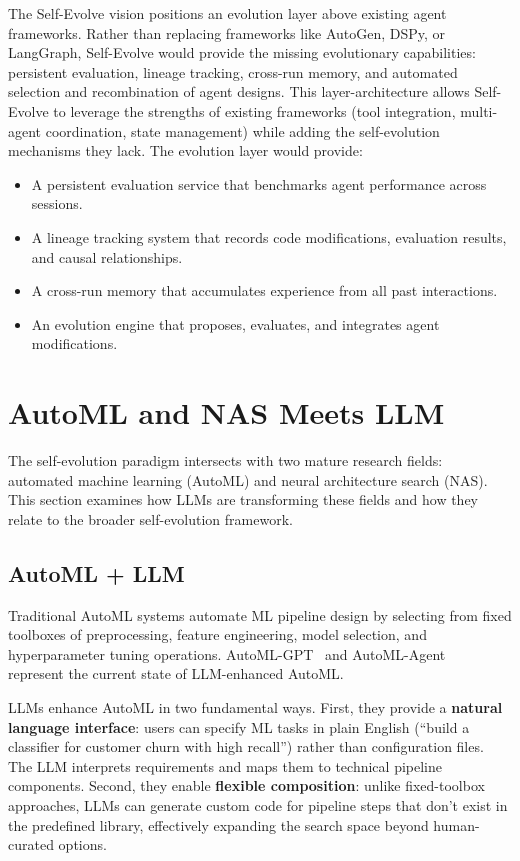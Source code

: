 \documentclass[11pt,a4paper]{article}
\begin{document}
The Self-Evolve vision positions an evolution layer above existing agent frameworks. Rather than replacing frameworks like AutoGen, DSPy, or LangGraph, Self-Evolve would provide the missing evolutionary capabilities: persistent evaluation, lineage tracking, cross-run memory, and automated selection and recombination of agent designs. This layer-architecture allows Self-Evolve to leverage the strengths of existing frameworks (tool integration, multi-agent coordination, state management) while adding the self-evolution mechanisms they lack. The evolution layer would provide:
\begin{itemize}
\item A persistent evaluation service that benchmarks agent performance across sessions.
\item A lineage tracking system that records code modifications, evaluation results, and causal relationships.
\item A cross-run memory that accumulates experience from all past interactions.
\item An evolution engine that proposes, evaluates, and integrates agent modifications.
\end{itemize}

\section{AutoML and NAS Meets LLM}
\label{sec:automl-nas}

The self-evolution paradigm intersects with two mature research fields: automated machine learning (AutoML) and neural architecture search (NAS). This section examines how LLMs are transforming these fields and how they relate to the broader self-evolution framework.

\subsection{AutoML + LLM}

Traditional AutoML systems automate ML pipeline design by selecting from fixed toolboxes of preprocessing, feature engineering, model selection, and hyperparameter tuning operations. AutoML-GPT~\citep{automlgpt2023} and AutoML-Agent~\citep{automlagent2024} represent the current state of LLM-enhanced AutoML.

LLMs enhance AutoML in two fundamental ways. First, they provide a \textbf{natural language interface}: users can specify ML tasks in plain English (``build a classifier for customer churn with high recall'') rather than configuration files. The LLM interprets requirements and maps them to technical pipeline components. Second, they enable \textbf{flexible composition}: unlike fixed-toolbox approaches, LLMs can generate custom code for pipeline steps that don't exist in the predefined library, effectively expanding the search space beyond human-curated options.
\end{document}
